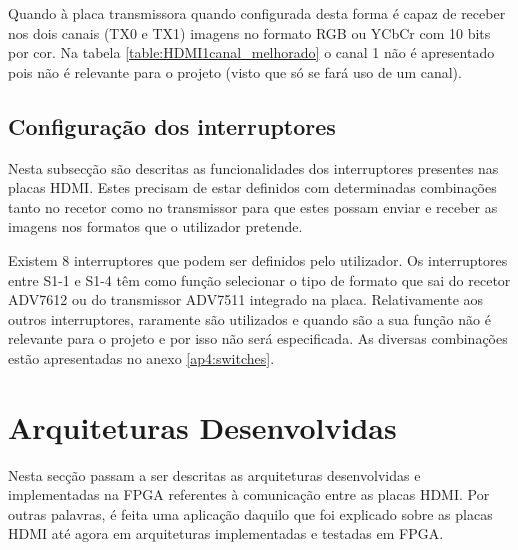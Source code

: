 Quando à placa transmissora quando configurada desta forma é capaz de receber nos dois canais (TX0 e TX1) imagens no formato RGB ou YCbCr com 10 bits por cor. Na tabela \ref{table:HDMI1canal_melhorado} o canal 1 não é apresentado pois não é relevante para o projeto (visto que só se fará uso de um canal).

\subsection{Configuração dos interruptores}

Nesta subsecção são descritas as funcionalidades dos interruptores presentes nas placas HDMI. Estes precisam de estar definidos com determinadas combinações tanto no recetor como no transmissor para que estes possam enviar e receber as imagens nos formatos que o utilizador pretende.

Existem 8 interruptores que podem ser definidos pelo utilizador. Os interruptores entre S1-1 e S1-4 têm como função selecionar o tipo de formato que sai do recetor ADV7612 ou do transmissor ADV7511 integrado na placa. Relativamente aos outros interruptores, raramente são utilizados e quando são a sua função não é relevante para o projeto e por isso não será especificada. As diversas combinações estão apresentadas no anexo \ref{ap4:switches}.


\section{Arquiteturas Desenvolvidas} \label{sec:HDMIarquiteturas}

Nesta secção passam a ser descritas as arquiteturas desenvolvidas e implementadas na FPGA referentes à comunicação entre as placas HDMI.  Por outras palavras, é feita uma aplicação daquilo que foi explicado sobre as placas HDMI até agora em arquiteturas implementadas e testadas em FPGA.

